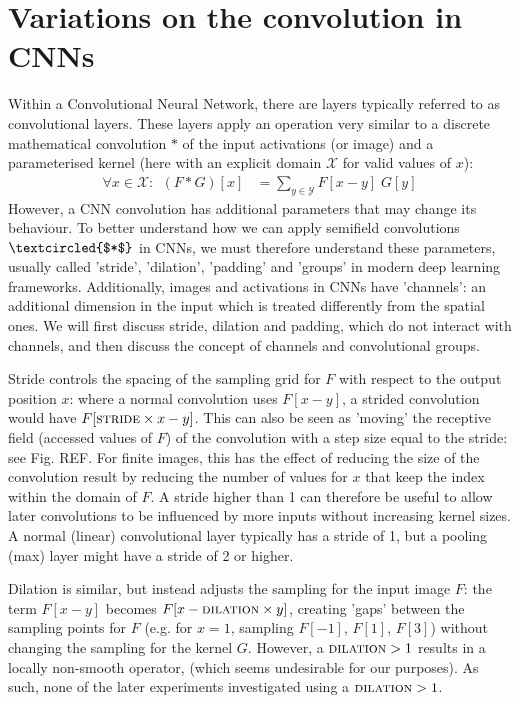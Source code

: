 \documentclass[a4paper, 12pt]{report}
\begin{document}
\section{Variations on the convolution in CNNs}
Within a Convolutional Neural Network, there are layers typically referred to as convolutional layers. These layers apply an operation very similar to a discrete mathematical convolution $*$ of the input activations (or image) and a parameterised kernel (here with an explicit domain $\mathcal{X}$ for valid values of $x$):
\begin{align}
\forall x\in\mathcal{X}:~~(F*G)[x] &= \sum_{y\in\mathcal{Y}} F[x-y]\; G[y]
\end{align}
However, a CNN convolution has additional parameters that may change its behaviour. To better understand how we can apply semifield convolutions $\textcircled{$*$}$ in CNNs, we must therefore understand these parameters, usually called 'stride', 'dilation', 'padding'  and 'groups' in modern deep learning frameworks. Additionally, images and activations in CNNs have 'channels': an additional dimension in the input which is treated differently from the spatial ones. We will first discuss stride, dilation and padding, which do not interact with channels, and then discuss the concept of channels and convolutional groups.

Stride controls the spacing of the sampling grid for $F$ with respect to the output position $x$: where a normal convolution uses $F[x-y]$, a strided convolution would have $F[\textsc{stride}\times x - y]$. This can also be seen as 'moving' the receptive field (accessed values of $F$) of the convolution with a step size equal to the stride: see Fig. REF. For finite images, this has the effect of reducing the size of the convolution result by reducing the number of values for $x$ that keep the index within the domain of $F$. A stride higher than 1 can therefore be useful to allow later convolutions to be influenced by more inputs without increasing kernel sizes. A normal (linear) convolutional layer typically has a stride of 1, but a pooling (max) layer might have a stride of 2 or higher.

Dilation is similar, but instead adjusts the sampling for the input image $F$: the term $F[x-y]$ becomes $F[x-\textsc{dilation}\times y]$, creating 'gaps' between the sampling points for $F$ (e.g. for $x=1$, sampling $F[-1]$, $F[1]$, $F[3]$) without changing the sampling for the kernel $G$. However, a $\textsc{dilation}>1$ results in a locally non-smooth operator, (which seems undesirable for our purposes). As such, none of the later experiments investigated using a $\textsc{dilation}>1$.
\end{document}
